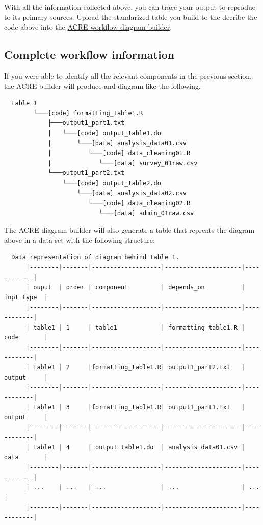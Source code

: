 \documentclass[]{book}
\begin{document}
With all the information collected above, you can trace your output to reprodue to its primary sources. Upload the standarized table you build to the decribe the code above into the \href{ADD\%20LINK}{ACRE workflow diagram builder}.

\hypertarget{complete-workflow-information}{%
\subsection{Complete workflow information}\label{complete-workflow-information}}

If you were able to identify all the relevant components in the previous section, the ACRE builder will produce and diagram like the following.

\begin{verbatim}
  table 1
        └───[code] formatting_table1.R
            ├───output1_part1.txt  
            |   └───[code] output_table1.do           
            |       └───[data] analysis_data01.csv
            |          └───[code] data_cleaning01.R
            |             └───[data] survey_01raw.csv
            └───output1_part2.txt  
                └───[code] output_table2.do           
                    └───[data] analysis_data02.csv
                       └───[code] data_cleaning02.R
                          └───[data] admin_01raw.csv  
\end{verbatim}

The ACRE diagram builder will also generate a table that reprents the diagram above in a data set with the following structure:

\begin{verbatim}
  Data representation of diagram behind Table 1.
      |--------|-------|-------------------|---------------------|------------|
      | ouput  | order | component         | depends_on          | inpt_type  |
      |--------|-------|-------------------|---------------------|------------|
      | table1 | 1     | table1            | formatting_table1.R | code       |
      |--------|-------|-------------------|---------------------|------------|
      | table1 | 2     |formatting_table1.R| output1_part2.txt   | output     |
      |--------|-------|-------------------|---------------------|------------|
      | table1 | 3     |formatting_table1.R| output1_part1.txt   | output     |
      |--------|-------|-------------------|---------------------|------------|
      | table1 | 4     | output_table1.do  | analysis_data01.csv | data       |
      |--------|-------|-------------------|---------------------|------------|
      | ...    | ...   | ...               | ...                 | ...        |
      |--------|-------|-------------------|---------------------|------------|
\end{verbatim}
\end{document}
